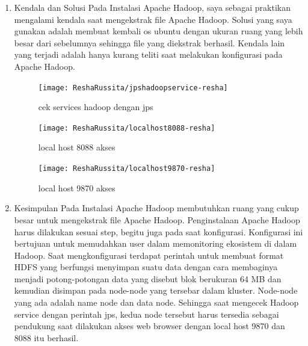 
\begin{enumerate}
\item Kendala dan Solusi
\newline Pada Instalasi Apache Hadoop, saya sebagai praktikan mengalami kendala saat mengekstrak file Apache Hadoop. Solusi yang saya gunakan adalah membuat kembali os ubuntu dengan ukuran ruang yang lebih besar dari sebelumnya sehingga file yang diekstrak berhasil. 
Kendala lain yang terjadi adalah hanya kurang teliti saat melakukan konfigurasi pada Apache Hadoop.

\begin{figure}[!ht]
\texttt{[image: ReshaRussita/jpshadoopservice-resha]}
\caption{cek services hadoop dengan jps}
\label{gam:perkuliahan-22-09}
\end{figure}

\begin{figure}[!ht]
\texttt{[image: ReshaRussita/localhost8088-resha]}
\caption{local host 8088 akses}
\label{gam:perkuliahan-22-09}
\end{figure}

\begin{figure}[!ht]
\texttt{[image: ReshaRussita/localhost9870-resha]}
\caption{local host 9870 akses}
\label{gam:perkuliahan-22-09}
\end{figure}

\newpage
\item Kesimpulan
\newline Pada Instalasi Apache Hadoop membutuhkan ruang yang cukup besar untuk mengekstrak file Apache Hadoop. Penginstalaan Apache Hadoop harus dilakukan sesuai step, begitu juga pada saat konfigurasi. Konfigurasi ini bertujuan untuk memudahkan user dalam memonitoring ekosistem di dalam Hadoop. Saat mengkonfigurasi terdapat perintah untuk membuat format HDFS yang berfungsi menyimpan suatu data dengan cara membaginya menjadi potong-potongan data yang disebut blok berukuran 64 MB dan kemudian disimpan pada node-node yang tersebar dalam kluster. Node-node yang ada adalah name node dan data node. Sehingga saat mengecek Hadoop service dengan perintah jps, kedua node tersebut harus tersedia sebagai pendukung saat dilakukan akses web browser dengan local host 9870 dan 8088 itu berhasil.
\end{enumerate}


